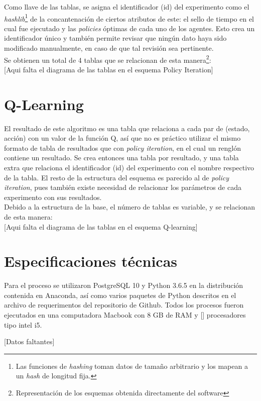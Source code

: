 Como llave de las tablas, se asigna el identificador (id) del experimento como el \textit{hashlib}\footnote{Las funciones de \textit{hashing} toman datos de tama\~no arbitrario y los mapean a un \textit{hash} de longitud fija.} de la concantenaci\'on de ciertos atributos de este: el sello de tiempo en el cual fue ejecutado y las \textit{policies} \'optimas de cada uno de los agentes. Esto crea un identificador \'unico y tambi\'en permite revisar que ning\'un dato haya sido modificado manualmente, en caso de que tal revisi\'on sea pertinente.\\

Se obtienen un total de 4 tablas que se relacionan de esta manera\footnote{Representaci\'on de los esquemas obtenida directamente del software }:\\

[Aqui falta el diagrama de las tablas en el esquema Policy Iteration]




\section{Q-Learning}

El resultado de este algoritmo es una tabla que relaciona a cada par de (estado, acci\'on) con un valor de la funci\'on Q, as\'i que no es pr\'actico utilizar el mismo formato de tabla de resultados que con \textit{policy iteration}, en el cual un rengl\'on contiene un resultado. Se crea entonces una tabla por resultado, y una tabla extra que relaciona el identificador (id) del experimento con el nombre respectivo de la tabla. El resto de la estructura del esquema es parecido al de \textit{policy iteration}, pues tambi\'en existe necesidad de relacionar los par\'ametros de cada experimento con sus resultados.\\

Debido a la estructura de la base, el n\'umero de tablas es variable, y se relacionan de esta manera:\\ 

[Aqui falta el diagrama de las tablas en el esquema Q-learning]

\section{Especificaciones t\'ecnicas}

Para el proceso se utilizaron PostgreSQL 10 y Python 3.6.5 en la distribuci\'on contenida en Anaconda, as\'i como varios paquetes de Python descritos en el archivo de requerimentos del repositorio de Github. Todos los procesos fueron ejecutados en una computadora Macbook con 8 GB de RAM y [] procesadores tipo intel i5.

[Datos faltantes]